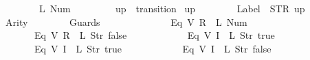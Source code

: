 \begin{isabellebody}
\ \ \ \ \ \ \ \ \ \ \ \ {\isacharparenleft}{}{\isacharcomma}\ {\isacharparenleft}L\ {\isacharparenleft}Num\ {}{\isacharparenright}{\isacharparenright}{\isacharparenright}\isanewline
\ \ \ \ \ \ {\isacharbrackright}\isanewline
{\isasymrparr}{\isachardoublequoteclose}\isanewline
\isanewline
{}\isamarkupfalse%
\ {\isachardoublequoteopen}up{}{}{\isachardoublequoteclose}\ {\isacharcolon}{\isacharcolon}\ {\isachardoublequoteopen}transition{\isachardoublequoteclose}\ \isanewline
{\isachardoublequoteopen}up{}{}\ {\isasymequiv}\ {\isasymlparr}\isanewline
\ \ \ \ \ \ Label\ {\isacharequal}\ STR\ {\isacharprime}{\isacharprime}up{\isacharprime}{\isacharprime}{\isacharcomma}\isanewline
\ \ \ \ \ \ Arity\ {\isacharequal}\ {}{\isacharcomma}\isanewline
\ \ \ \ \ \ Guards\ {\isacharequal}\ {\isacharbrackleft}\isanewline
\ \ \ \ \ \ \ \ \ \ \ \ {\isacharparenleft}Eq\ {\isacharparenleft}V\ {\isacharparenleft}R\ {}{\isacharparenright}{\isacharparenright}\ {\isacharparenleft}L\ {\isacharparenleft}Num\ {}{\isacharparenright}{\isacharparenright}{\isacharparenright}{\isacharcomma}\isanewline
\ \ \ \ \ \ \ \ \ \ \ \ {\isacharparenleft}Eq\ {\isacharparenleft}V\ {\isacharparenleft}R\ {}{\isacharparenright}{\isacharparenright}\ {\isacharparenleft}L\ {\isacharparenleft}Str\ {\isacharprime}{\isacharprime}false{\isacharprime}{\isacharprime}{\isacharparenright}{\isacharparenright}{\isacharparenright}{\isacharcomma}\isanewline
\ \ \ \ \ \ \ \ \ \ \ \ {\isacharparenleft}Eq\ {\isacharparenleft}V\ {\isacharparenleft}I\ {}{\isacharparenright}{\isacharparenright}\ {\isacharparenleft}L\ {\isacharparenleft}Str\ {\isacharprime}{\isacharprime}true{\isacharprime}{\isacharprime}{\isacharparenright}{\isacharparenright}{\isacharparenright}{\isacharcomma}\isanewline
\ \ \ \ \ \ \ \ \ \ \ \ {\isacharparenleft}Eq\ {\isacharparenleft}V\ {\isacharparenleft}I\ {}{\isacharparenright}{\isacharparenright}\ {\isacharparenleft}L\ {\isacharparenleft}Str\ {\isacharprime}{\isacharprime}true{\isacharprime}{\isacharprime}{\isacharparenright}{\isacharparenright}{\isacharparenright}{\isacharcomma}\isanewline
\ \ \ \ \ \ \ \ \ \ \ \ {\isacharparenleft}Eq\ {\isacharparenleft}V\ {\isacharparenleft}I\ {}{\isacharparenright}{\isacharparenright}\ {\isacharparenleft}L\ {\isacharparenleft}Str\ {\isacharprime}{\isacharprime}false{\isacharprime}{\isacharprime}{\isacharparenright}{\isacharparenright}{\isacharparenright}\isanewline
\ \ \ \ \ \ {\isacharbrackright}{\isacharcomma}\isanewline

\end{isabellebody}
